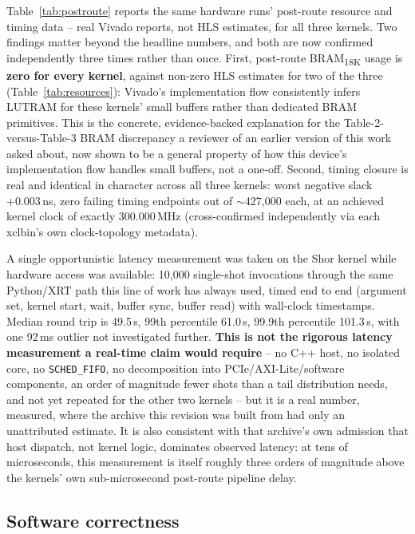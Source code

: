 Table~\ref{tab:postroute} reports the same hardware runs' post-route resource and timing data -- real Vivado reports, not HLS estimates, for all three kernels. Two findings matter beyond the headline numbers, and both are now confirmed independently three times rather than once. First, post-route BRAM\textsubscript{18K} usage is \textbf{zero for every kernel}, against non-zero HLS estimates for two of the three (Table~\ref{tab:resources}): Vivado's implementation flow consistently infers LUTRAM for these kernels' small buffers rather than dedicated BRAM primitives. This is the concrete, evidence-backed explanation for the Table-2-versus-Table-3 BRAM discrepancy a reviewer of an earlier version of this work asked about, now shown to be a general property of how this device's implementation flow handles small buffers, not a one-off. Second, timing closure is real and identical in character across all three kernels: worst negative slack $+0.003$\,ns, zero failing timing endpoints out of $\sim$427,000 each, at an achieved kernel clock of exactly 300.000\,MHz (cross-confirmed independently via each xclbin's own clock-topology metadata).

A single opportunistic latency measurement was taken on the Shor kernel while hardware access was available: 10,000 single-shot invocations through the same Python/XRT path this line of work has always used, timed end to end (argument set, kernel start, wait, buffer sync, buffer read) with wall-clock timestamps. Median round trip is 49.5\,\textmu{}s, 99th percentile 61.0\,\textmu{}s, 99.9th percentile 101.3\,\textmu{}s, with one 92\,ms outlier not investigated further. \textbf{This is not the rigorous latency measurement a real-time claim would require} -- no C++ host, no isolated core, no \texttt{SCHED\_FIFO}, no decomposition into PCIe/AXI-Lite/software components, an order of magnitude fewer shots than a tail distribution needs, and not yet repeated for the other two kernels -- but it is a real number, measured, where the archive this revision was built from had only an unattributed estimate. It is also consistent with that archive's own admission that host dispatch, not kernel logic, dominates observed latency: at tens of microseconds, this measurement is itself roughly three orders of magnitude above the kernels' own sub-microsecond post-route pipeline delay.

\subsection{Software correctness}\label{subsec:res-correctness}

